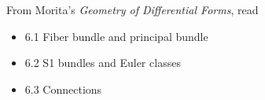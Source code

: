 \documentclass{homework}
\author{Jim Fowler}
\date{Week 15: Fiber Bundles}
\begin{document}
\maketitle

From Morita's \textit{Geometry of Differential Forms}, read
\begin{itemize}
\item 6.1 Fiber bundle and principal bundle
\item 6.2 S1 bundles and Euler classes
\item 6.3 Connections
\end{itemize}
\end{document}
